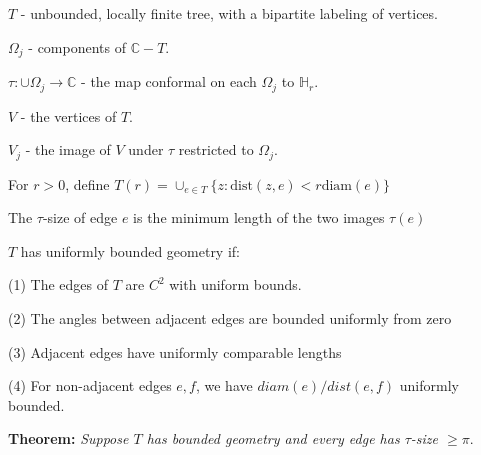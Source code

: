 \documentclass{beamer}
\begin{document}
\begin{frame}

{\tiny $T$ - unbounded, locally finite tree, with a bipartite labeling of vertices.

$\Omega_j$ - components of $\mathbb{C}-T$.

$\tau: \cup \Omega_j \rightarrow \mathbb{C}$ - the map conformal on each $\Omega_j$ to $\mathbb{H}_r$.

$V$ - the vertices of $T$. 

$V_j$ - the image of $V$ under $\tau$ restricted to $\Omega_j$.

For $r > 0$, define $T(r) = \cup_{e\in T} \{z : \textrm{dist}(z,e) < r\textrm{diam}(e) \}$

The $\tau$-size of edge $e$ is the minimum length of the two images $\tau(e)$

\vspace{2.5mm}

$T$ has uniformly bounded geometry if: 

\hspace{5mm} (1) The edges of $T$ are $C^2$ with uniform bounds. 

\hspace{5mm} (2) The angles between adjacent edges are bounded uniformly from zero

\hspace{5mm} (3) Adjacent edges have uniformly comparable lengths

\hspace{5mm} (4) For non-adjacent edges $e, f$, we have $diam(e)/dist(e,f)$ uniformly bounded. 

 }
\vspace{5mm}
{\bf Theorem:} {\it  Suppose $T$ has bounded geometry and every edge has $\tau$-size $\geq \pi.$  }  

\end{frame}
\end{document}
